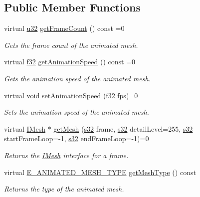 \subsection*{Public Member Functions}
\begin{DoxyCompactItemize}
\item 
virtual \hyperlink{namespaceirr_a0416a53257075833e7002efd0a18e804}{u32} \hyperlink{classirr_1_1scene_1_1IAnimatedMesh_a2ec99aba081e9f37802e8ea9cd65629b}{get\+Frame\+Count} () const =0
\begin{DoxyCompactList}\small\item\em Gets the frame count of the animated mesh. \end{DoxyCompactList}\item 
virtual \hyperlink{namespaceirr_a0277be98d67dc26ff93b1a6a1d086b07}{f32} \hyperlink{classirr_1_1scene_1_1IAnimatedMesh_acb4249295319c8240d5bedc167417435}{get\+Animation\+Speed} () const =0
\begin{DoxyCompactList}\small\item\em Gets the animation speed of the animated mesh. \end{DoxyCompactList}\item 
virtual void \hyperlink{classirr_1_1scene_1_1IAnimatedMesh_a5eb1b09d96547dbd273d489e58d62658}{set\+Animation\+Speed} (\hyperlink{namespaceirr_a0277be98d67dc26ff93b1a6a1d086b07}{f32} fps)=0
\begin{DoxyCompactList}\small\item\em Sets the animation speed of the animated mesh. \end{DoxyCompactList}\item 
virtual \hyperlink{classirr_1_1scene_1_1IMesh}{I\+Mesh} $\ast$ \hyperlink{classirr_1_1scene_1_1IAnimatedMesh_adccb39fee83bed36a464cf7b96f3a0ca}{get\+Mesh} (\hyperlink{namespaceirr_ac66849b7a6ed16e30ebede579f9b47c6}{s32} frame, \hyperlink{namespaceirr_ac66849b7a6ed16e30ebede579f9b47c6}{s32} detail\+Level=255, \hyperlink{namespaceirr_ac66849b7a6ed16e30ebede579f9b47c6}{s32} start\+Frame\+Loop=-\/1, \hyperlink{namespaceirr_ac66849b7a6ed16e30ebede579f9b47c6}{s32} end\+Frame\+Loop=-\/1)=0
\begin{DoxyCompactList}\small\item\em Returns the \hyperlink{classirr_1_1scene_1_1IMesh}{I\+Mesh} interface for a frame. \end{DoxyCompactList}\item 
virtual \hyperlink{namespaceirr_1_1scene_a2fc85a64604521ca063f1881b5dd1c61}{E\+\_\+\+A\+N\+I\+M\+A\+T\+E\+D\+\_\+\+M\+E\+S\+H\+\_\+\+T\+Y\+PE} \hyperlink{classirr_1_1scene_1_1IAnimatedMesh_abe5a20eccfb94eefcc6cbbc0b667ce37}{get\+Mesh\+Type} () const
\begin{DoxyCompactList}\small\item\em Returns the type of the animated mesh. \end{DoxyCompactList}\end{DoxyCompactItemize}
